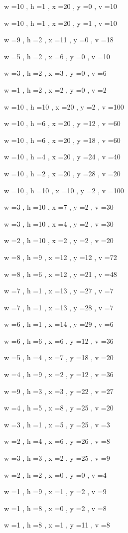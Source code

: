 \documentclass[11pt]{article}
\begin{document}
w =10 , h =1 , x =20 , y =0 , v =10
\par
w =10 , h =1 , x =20 , y =1 , v =10
\par
w =9 , h =2 , x =11 , y =0 , v =18
\par
w =5 , h =2 , x =6 , y =0 , v =10
\par
w =3 , h =2 , x =3 , y =0 , v =6
\par
w =1 , h =2 , x =2 , y =0 , v =2
\par
w =10 , h =10 , x =20 , y =2 , v =100
\par
w =10 , h =6 , x =20 , y =12 , v =60
\par
w =10 , h =6 , x =20 , y =18 , v =60
\par
w =10 , h =4 , x =20 , y =24 , v =40
\par
w =10 , h =2 , x =20 , y =28 , v =20
\par
w =10 , h =10 , x =10 , y =2 , v =100
\par
w =3 , h =10 , x =7 , y =2 , v =30
\par
w =3 , h =10 , x =4 , y =2 , v =30
\par
w =2 , h =10 , x =2 , y =2 , v =20
\par
w =8 , h =9 , x =12 , y =12 , v =72
\par
w =8 , h =6 , x =12 , y =21 , v =48
\par
w =7 , h =1 , x =13 , y =27 , v =7
\par
w =7 , h =1 , x =13 , y =28 , v =7
\par
w =6 , h =1 , x =14 , y =29 , v =6
\par
w =6 , h =6 , x =6 , y =12 , v =36
\par
w =5 , h =4 , x =7 , y =18 , v =20
\par
w =4 , h =9 , x =2 , y =12 , v =36
\par
w =9 , h =3 , x =3 , y =22 , v =27
\par
w =4 , h =5 , x =8 , y =25 , v =20
\par
w =3 , h =1 , x =5 , y =25 , v =3
\par
w =2 , h =4 , x =6 , y =26 , v =8
\par
w =3 , h =3 , x =2 , y =25 , v =9
\par
w =2 , h =2 , x =0 , y =0 , v =4
\par
w =1 , h =9 , x =1 , y =2 , v =9
\par
w =1 , h =8 , x =0 , y =2 , v =8
\par
w =1 , h =8 , x =1 , y =11 , v =8
\par
\newpage
\end{document}
